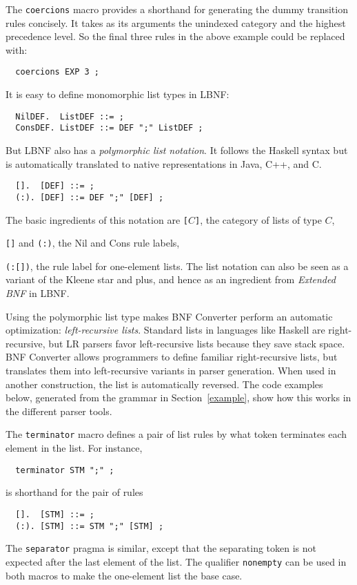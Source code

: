 The {\tt coercions} macro provides a shorthand for 
generating the dummy transition rules concisely. It takes as its
arguments the unindexed category and the highest precedence level. So the final three rules in the above example could be replaced with:
\begin{verbatim}
  coercions EXP 3 ;
\end{verbatim}


It is easy to define monomorphic list types in LBNF:
\begin{verbatim}
  NilDEF.  ListDEF ::= ;
  ConsDEF. ListDEF ::= DEF ";" ListDEF ;
\end{verbatim}
But LBNF also has a \textit{polymorphic list notation}. It follows the
Haskell syntax but is automatically translated to native representations
in Java, C++, and C.
\begin{verbatim}
  [].  [DEF] ::= ;
  (:). [DEF] ::= DEF ";" [DEF] ;
\end{verbatim}
The basic ingredients of this notation are
\bequ
{\tt[}$C${\tt ]}, the category of lists of type $C$,
 
{\tt []} and {\tt (:)}, the Nil and Cons rule labels,

{\tt (:[])}, the rule label for one-element lists. 
\enqu
The list notation can also be seen as a variant of the 
Kleene star and plus, and hence as an ingredient from \textit{Extended BNF} in LBNF.

\label{leftrec}

Using the polymorphic list type makes BNF Converter perform
an automatic optimization: \textit{left-recursive lists}. 
Standard lists in
languages like Haskell are right-recursive, but
LR parsers favor left-recursive lists because they save 
stack space. 
BNF Converter allows programmers to define familiar 
right-recursive lists, but translates them into 
left-recursive variants in parser generation.
When used in another construction, the list is automatically 
reversed. The code examples below, generated from the grammar in
Section~\ref{example}, show how this works in the different parser tools.


\label{lists}

The {\tt terminator} macro defines a pair of list rules by what
token terminates each element in the list. For instance,
\begin{verbatim}
  terminator STM ";" ;
\end{verbatim}
is shorthand for the pair of rules
\begin{verbatim}
  [].  [STM] ::= ;
  (:). [STM] ::= STM ";" [STM] ;
\end{verbatim}
The {\tt separator} pragma is similar,
except that the separating token is not expected after the last
element of the list. 
The qualifier {\tt nonempty} can be used in both macros to 
make the one-element list the base case. 




